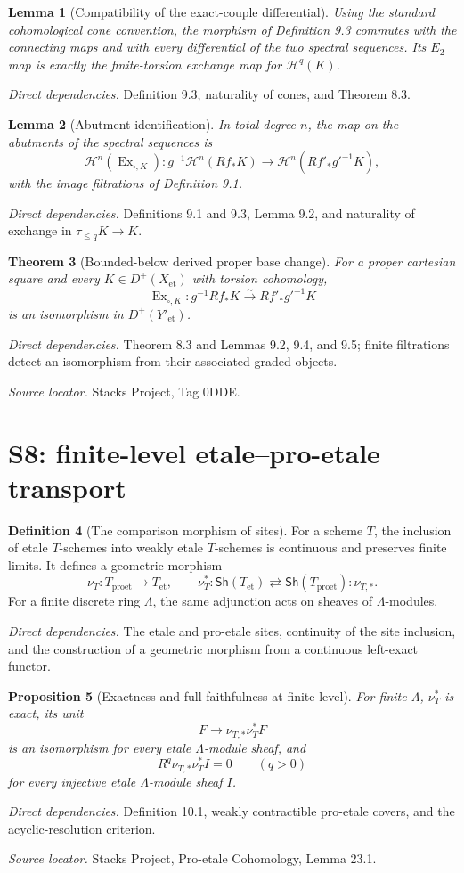 \documentclass[10pt]{article}
\newtheorem{theorem}{Theorem}[section]
\newtheorem{proposition}[theorem]{Proposition}
\newtheorem{lemma}[theorem]{Lemma}
\theoremstyle{definition}
\newtheorem{definition}[theorem]{Definition}
\newcommand{\Sh}{\mathsf{Sh}}
\newcommand{\Dplus}{D^+}
\newcommand{\Et}{\mathrm{et}}
\newcommand{\Proet}{\mathrm{proet}}
\newcommand{\Ex}{\operatorname{Ex}}
\newcommand{\deps}[1]{\par\smallskip\textit{Direct dependencies.} #1\par}
\newcommand{\sources}[1]{\par\textit{Source locator.} #1\par}
\begin{document}
\begin{lemma}[Compatibility of the exact-couple differential]
Using the standard cohomological cone convention, the morphism of
Definition 9.3 commutes with the connecting maps and with every differential
of the two spectral sequences.  Its $E_2$ map is exactly the finite-torsion
exchange map for $\mathcal H^q(K)$.
\end{lemma}
\deps{Definition 9.3, naturality of cones, and Theorem 8.3.}

\begin{lemma}[Abutment identification]
In total degree $n$, the map on the abutments of the spectral sequences is
\[
 \mathcal H^n(\Ex_{\square,K}):
 g^{-1}\mathcal H^n(Rf_*K)\longrightarrow
 \mathcal H^n(Rf'_*g'^{-1}K),
\]
with the image filtrations of Definition 9.1.
\end{lemma}
\deps{Definitions 9.1 and 9.3, Lemma 9.2, and naturality of exchange in
$\tau_{\leq q}K\to K$.}

\begin{theorem}[Bounded-below derived proper base change]
For a proper cartesian square and every
$K\in\Dplus(X_{\Et})$ with torsion cohomology,
\[
 \Ex_{\square,K}:g^{-1}Rf_*K
 \xrightarrow{\sim}Rf'_*g'^{-1}K
\]
is an isomorphism in $\Dplus(Y'_{\Et})$.
\end{theorem}
\deps{Theorem 8.3 and Lemmas 9.2, 9.4, and 9.5; finite filtrations detect
an isomorphism from their associated graded objects.}
\sources{Stacks Project, Tag 0DDE.}

\section{S8: finite-level etale--pro-etale transport}

\begin{definition}[The comparison morphism of sites]
For a scheme $T$, the inclusion of etale $T$-schemes into weakly etale
$T$-schemes is continuous and preserves finite limits.  It defines a
geometric morphism
\[
 \nu_T:T_{\Proet}\longrightarrow T_{\Et},
 \qquad
 \nu_T^*:\Sh(T_{\Et})\rightleftarrows
 \Sh(T_{\Proet}):\nu_{T,*}.
\]
For a finite discrete ring $\Lambda$, the same adjunction acts on sheaves
of $\Lambda$-modules.
\end{definition}
\deps{The etale and pro-etale sites, continuity of the site inclusion, and
the construction of a geometric morphism from a continuous left-exact
functor.}

\begin{proposition}[Exactness and full faithfulness at finite level]
For finite $\Lambda$, $\nu_T^*$ is exact, its unit
\[
 F\longrightarrow\nu_{T,*}\nu_T^*F
\]
is an isomorphism for every etale $\Lambda$-module sheaf, and
\[
 R^q\nu_{T,*}\nu_T^*I=0\qquad(q>0)
\]
for every injective etale $\Lambda$-module sheaf $I$.
\end{proposition}
\deps{Definition 10.1, weakly contractible pro-etale covers, and the
acyclic-resolution criterion.}
\sources{Stacks Project, Pro-etale Cohomology, Lemma 23.1.}
\end{document}
